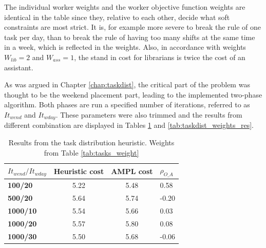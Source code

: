 The individual worker weights and the worker objective function weights are identical in the table since they, relative to each other, decide what soft constraints are most strict. It is, for example more severe to break the rule of one task per day, than to break the rule of having too many shifts at the same time in a week, which is reflected in the weights. Also, in accordance with weights $W_{lib} = 2$ and $W_{ass} = 1$, the stand in cost for librarians is twice the cost of an assistant.

As was argued in Chapter \ref{chap:taskdist}, the critical part of the problem was thought to be the weekend placement part, leading to the implemented two-phase algorithm. Both phases are run a specified number of iterations, referred to as $It_{wend}$ and $It_{wday}$. These parameters were also trimmed and the results from different combination are displayed in Tables \ref{tab:taskdist_res} and \ref{tab:taskdist_weights_res}. 

\begin{table}[!h]
\centering
\label{tab:taskdist_res}
\caption{Results from the task distribution heuristic. Weights from Table \ref{tab:tasks_weight}}
\begin{tabular}{|l|l|l|l|}
\hline
\rowcolor{Gray} \textbf{$It_{wend}/It_{wday}$} &  \textbf{Heuristic cost} &  \textbf{AMPL cost} & \textbf{$\rho_{O\_A}$} \\ \hline
\cellcolor{Gray} \textbf{100/20} & \multicolumn{1}{c|}{5.22} & \multicolumn{1}{c|}{5.48} & 0.58 \\
\cellcolor{Gray} \textbf{500/20} & \multicolumn{1}{c|}{5.64} & \multicolumn{1}{c|}{5.74} & -0.20 \\
\cellcolor{Gray} \textbf{1000/10} & \multicolumn{1}{c|}{5.54} & \multicolumn{1}{c|}{5.66} & 0.03 \\
\cellcolor{Gray} \textbf{1000/20} & \multicolumn{1}{c|}{5.57} & \multicolumn{1}{c|}{5.80} & 0.08 \\
\cellcolor{Gray} \textbf{1000/30} & \multicolumn{1}{c|}{5.50} & \multicolumn{1}{c|}{5.68} & -0.06 \\
\hline
\end{tabular}
\end{table}

